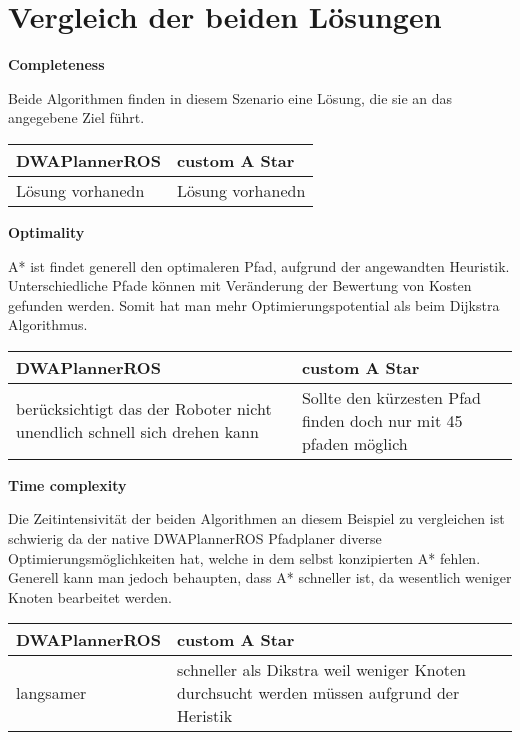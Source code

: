 \documentclass{article}
\begin{document}
\section{Vergleich der beiden Lösungen}

\textbf{Completeness}\newline

Beide Algorithmen finden in diesem Szenario eine Lösung, die sie an das angegebene Ziel führt. 

\begin{table}[!htbp]
    \begin{tabular}{p{7cm}|p{7cm}}
        DWAPlannerROS & custom A Star \\ \bottomrule
        Lösung vorhanedn & Lösung vorhanedn
    \end{tabular}
\end{table}

\textbf{Optimality}\newline

A* ist findet generell den optimaleren Pfad, aufgrund der angewandten Heuristik. Unterschiedliche Pfade können mit Veränderung der Bewertung von Kosten gefunden werden. Somit hat man mehr Optimierungspotential als beim Dijkstra Algorithmus.

\begin{table}[!htbp]
    \begin{tabular}{p{7cm}|p{7cm}}
        DWAPlannerROS & custom A Star \\ \bottomrule
     berücksichtigt das der Roboter nicht unendlich schnell sich drehen kann & Sollte den kürzesten Pfad finden doch nur mit 45 pfaden möglich
    \end{tabular}
\end{table}


\textbf{Time complexity}\newline

Die Zeitintensivität der beiden Algorithmen an diesem Beispiel zu vergleichen ist schwierig da der native DWAPlannerROS Pfadplaner diverse Optimierungsmöglichkeiten hat, welche in dem selbst konzipierten A* fehlen.
Generell kann man jedoch behaupten, dass A* schneller ist, da wesentlich weniger Knoten bearbeitet werden.

\begin{table}[!htbp]
    \begin{tabular}{p{7cm}|p{7cm}}
        DWAPlannerROS & custom A Star \\ \bottomrule
    langsamer & schneller als Dikstra weil weniger Knoten durchsucht werden müssen aufgrund der Heristik
    \end{tabular}
\end{table}
\end{document}
